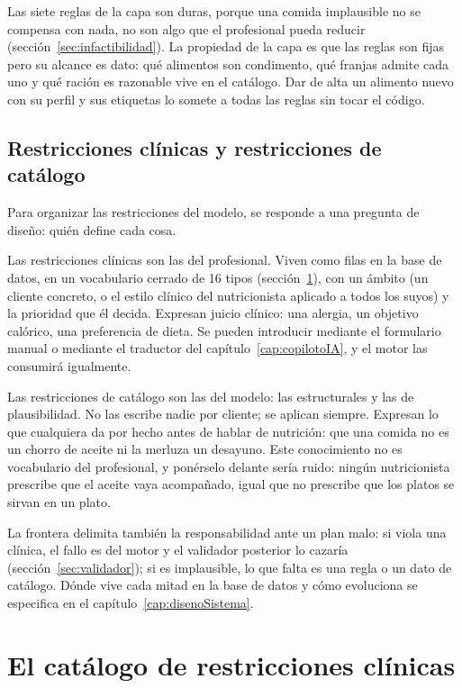 Las siete reglas de la capa son duras, porque una comida implausible no se compensa con nada, no son algo que el profesional pueda reducir (sección~\ref{sec:infactibilidad}). La propiedad de la capa es que las reglas son fijas pero su alcance es dato: qué alimentos son condimento, qué franjas admite cada uno y qué ración es razonable vive en el catálogo. Dar de alta un alimento nuevo con su perfil y sus etiquetas lo somete a todas las reglas sin tocar el código.

\subsection{Restricciones clínicas y restricciones de catálogo}
\label{sec:clinicasCatalogo}

Para organizar las restricciones del modelo, se responde a una pregunta de diseño: quién define cada cosa.

Las restricciones clínicas son las del profesional. Viven como filas en la base de datos, en un vocabulario cerrado de 16 tipos (sección~\ref{sec:catalogoClinico}), con un ámbito (un cliente concreto, o el estilo clínico del nutricionista aplicado a todos los suyos) y la prioridad que él decida. Expresan juicio clínico: una alergia, un objetivo calórico, una preferencia de dieta. Se pueden introducir mediante el formulario manual o mediante el traductor del capítulo~\ref{cap:copilotoIA}, y el motor las consumirá igualmente.

Las restricciones de catálogo son las del modelo: las estructurales y las de plausibilidad. No las escribe nadie por cliente; se aplican siempre. Expresan lo que cualquiera da por hecho antes de hablar de nutrición: que una comida no es un chorro de aceite ni la merluza un desayuno. Este conocimiento no es vocabulario del profesional, y ponérselo delante sería ruido: ningún nutricionista prescribe que el aceite vaya acompañado, igual que no prescribe que los platos se sirvan en un plato.

La frontera delimita también la responsabilidad ante un plan malo: si viola una clínica, el fallo es del motor y el validador posterior lo cazaría (sección~\ref{sec:validador}); si es implausible, lo que falta es una regla o un dato de catálogo. Dónde vive cada mitad en la base de datos y cómo evoluciona se especifica en el capítulo~\ref{cap:disenoSistema}.

\section{El catálogo de restricciones clínicas}
\label{sec:catalogoClinico}

